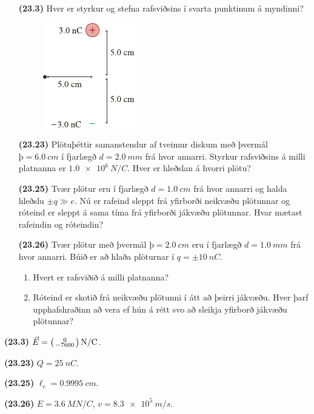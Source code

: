 \ifdefined \wholebook \else\documentclass[oneside]{book}\usepackage{EdlBook}\graphicspath{{figures/}}
\begin{document}
\begin{enumerate}[label = \textbf{(\alph*)}]

\item[\textbf{(23.3)}] Hver er styrkur og stefna rafsviðsins í svarta punktinum á myndinni?

\begin{figure}[H]
    \centering
    \includegraphics{figures/rk233.pdf}
\end{figure}

\item[\textbf{(23.23)}] Plötuþéttir samanstendur af tveimur diskum með þvermál $þ = \SI{6.0}{cm}$ í fjarlægð $d = \SI{2.0}{mm}$ frá hvor annarri. Styrkur rafsviðsins á milli platnanna er $\SI{1.0e6}{N/C}$. Hver er hleðslan á hvorri plötu?

\item[\textbf{(23.25)}] Tvær plötur eru í fjarlægð $d = \SI{1.0}{cm}$ frá hvor annarri og halda hleðslu $\pm q \gg e$. Nú er rafeind sleppt frá yfirborði neikvæðu plötunnar og róteind er sleppt á sama tíma frá yfirborði jákvæðu plötunnar. Hvar mætast rafeindin og róteindin?

\item[\textbf{(23.26)}] Tvær plötur með þvermál $þ = \SI{2.0}{cm}$ eru í fjarlægð $d = \SI{1.0}{mm}$ frá hvor annarri. Búið er að hlaða plöturnar í $q = \pm\SI{10}{nC}$. 
\begin{enumerate}[label = \textbf{(\alph*)}]
    \item Hvert er rafsviðið á milli platnanna?
    \item Róteind er skotið frá neikvæðu plötunni í átt að þeirri jákvæðu. Hver þarf upphafshraðinn að vera ef hún á rétt svo að sleikja yfirborð jákvæðu plötunnar?
\end{enumerate}

\end{enumerate}

\begin{tcolorbox}
\begin{enumerate*}[label = \vspace{0.15cm} ]
  \item \textbf{(23.3)} $\vec{E} = \smqty(0 \\ -7600) \, \si{N/C}$.
  \item \textbf{(23.23)} $Q = \SI{25}{nC}$.
  \item \textbf{(23.25)} $\ell_e = \SI{0.9995}{cm}$.
  \item \textbf{(23.26)} $E = \SI{3.6}{MN/C}$, $v = \SI{8.3e5}{m/s}$.
\end{enumerate*}
\end{tcolorbox}
\end{document}
